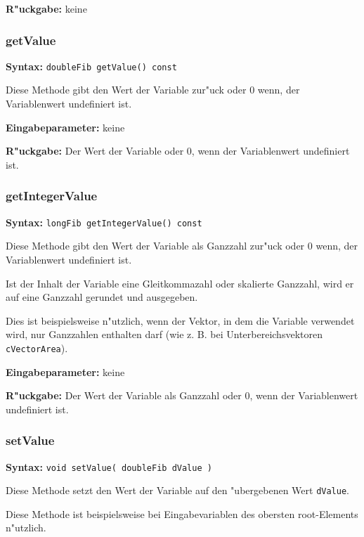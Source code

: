 \bigskip\noindent
\textbf{R"uckgabe:} keine


\subsubsection{getValue}

\textbf{Syntax:} \verb|doubleFib getValue() const|

\bigskip\noindent
Diese Methode gibt den Wert der Variable zur"uck oder $0$ wenn, der Variablenwert undefiniert ist.

\bigskip\noindent
\textbf{Eingabeparameter:} keine

\bigskip\noindent
\textbf{R"uckgabe:} Der Wert der Variable oder $0$, wenn der Variablenwert undefiniert ist.


\subsubsection{getIntegerValue}

\textbf{Syntax:} \verb|longFib getIntegerValue() const|

\bigskip\noindent
Diese Methode gibt den Wert der Variable als Ganzzahl zur"uck oder $0$ wenn, der Variablenwert undefiniert ist.

Ist der Inhalt der Variable eine Gleitkommazahl oder skalierte Ganzzahl, wird er auf eine Ganzzahl gerundet und ausgegeben.

Dies ist beispielsweise n"utzlich, wenn der Vektor, in dem die Variable verwendet wird, nur Ganzzahlen enthalten darf (wie z. B. bei Unterbereichsvektoren \verb|cVectorArea|).

\bigskip\noindent
\textbf{Eingabeparameter:} keine

\bigskip\noindent
\textbf{R"uckgabe:} Der Wert der Variable als Ganzzahl oder $0$, wenn der Variablenwert undefiniert ist.


\subsubsection{setValue}

\textbf{Syntax:} \verb|void setValue( doubleFib dValue )|

\bigskip\noindent
Diese Methode setzt den Wert der Variable auf den "ubergebenen Wert \verb|dValue|.

Diese Methode ist beispielsweise bei Eingabevariablen des obersten root-\-Ele\-men\-ts n"utzlich.

